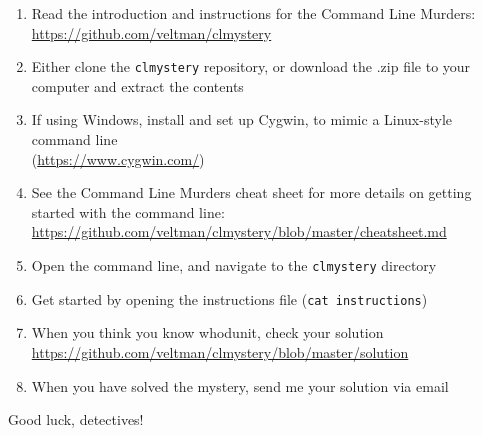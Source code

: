 \documentclass[11pt]{article}
\begin{document}
\begin{enumerate}
\item Read the introduction and instructions for the Command Line Murders: \\ \url{https://github.com/veltman/clmystery}
\item Either clone the \texttt{clmystery} repository, or download the .zip file to your computer and extract the contents
\item If using Windows, install and set up Cygwin, to mimic a Linux-style command line\\ (\url{https://www.cygwin.com/})
\item See the Command Line Murders cheat sheet for more details on getting started with the command line:\\ \url{https://github.com/veltman/clmystery/blob/master/cheatsheet.md}
\item Open the command line, and navigate to the \texttt{clmystery} directory
\item Get started by opening the instructions file (\texttt{cat instructions})
\item When you think you know whodunit, check your solution \\ \url{https://github.com/veltman/clmystery/blob/master/solution}
\item When you have solved the mystery, send me your solution via email
\end{enumerate}

\noindent Good luck, detectives!
\end{document}
